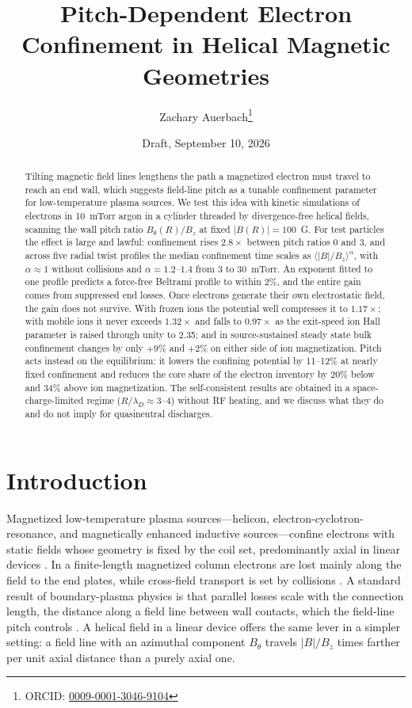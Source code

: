 \documentclass[11pt]{article}
\title{Pitch-Dependent Electron Confinement in Helical Magnetic Geometries}
\author{Zachary Auerbach\thanks{ORCID: \href{https://orcid.org/0009-0001-3046-9104}{0009-0001-3046-9104}}}
\date{Draft, September 10, 2026}
\begin{document}
\maketitle

\begin{abstract}
Tilting magnetic field lines lengthens the path a magnetized electron must travel to reach an end wall, which suggests field-line pitch as a tunable confinement parameter for low-temperature plasma sources. We test this idea with kinetic simulations of electrons in 10~mTorr argon in a cylinder threaded by divergence-free helical fields, scanning the wall pitch ratio $B_\theta(R)/B_z$ at fixed $|B(R)| = 100$~G. For test particles the effect is large and lawful: confinement rises $2.8\times$ between pitch ratios 0 and 3, and across five radial twist profiles the median confinement time scales as $\langle |B|/B_z\rangle^{\alpha}$, with $\alpha \approx 1$ without collisions and $\alpha = 1.2$--$1.4$ from 3 to 30~mTorr. An exponent fitted to one profile predicts a force-free Beltrami profile to within 2\%, and the entire gain comes from suppressed end losses. Once electrons generate their own electrostatic field, the gain does not survive. With frozen ions the potential well compresses it to $1.17\times$; with mobile ions it never exceeds $1.32\times$ and falls to $0.97\times$ as the exit-speed ion Hall parameter is raised through unity to 2.35; and in source-sustained steady state bulk confinement changes by only $+9\%$ and $+2\%$ on either side of ion magnetization. Pitch acts instead on the equilibrium: it lowers the confining potential by 11--12\% at nearly fixed confinement and reduces the core share of the electron inventory by 20\% below and 34\% above ion magnetization. The self-consistent results are obtained in a space-charge-limited regime ($R/\lambda_D \approx 3$--4) without RF heating, and we discuss what they do and do not imply for quasineutral discharges.
\end{abstract}

\section{Introduction}
\label{sec:intro}

Magnetized low-temperature plasma sources---helicon, electron-cyclotron-resonance, and magnetically enhanced inductive sources---confine electrons with static fields whose geometry is fixed by the coil set, predominantly axial in linear devices \cite{lieberman,chabert,chen2015}. In a finite-length magnetized column electrons are lost mainly along the field to the end plates, while cross-field transport is set by collisions \cite{curreli2014}. A standard result of boundary-plasma physics is that parallel losses scale with the connection length, the distance along a field line between wall contacts, which the field-line pitch controls \cite{stangeby}. A helical field in a linear device offers the same lever in a simpler setting: a field line with an azimuthal component $B_\theta$ travels $|B|/B_z$ times farther per unit axial distance than a purely axial one.
\end{document}
